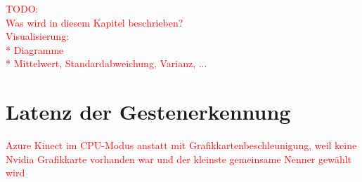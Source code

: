 















\textcolor{red}{TODO:\\
Was wird in diesem Kapitel beschrieben?\\
Visualisierung:\\
* Diagramme\\
* Mittelwert, Standardabweichung, Varianz, ...
}







\section{Latenz der Gestenerkennung}
\textcolor{red}{Azure Kinect im CPU-Modus anstatt mit Grafikkartenbeschleunigung, weil keine Nvidia Grafikkarte vorhanden war und der kleinste gemeinsame Nenner gewählt wird}


